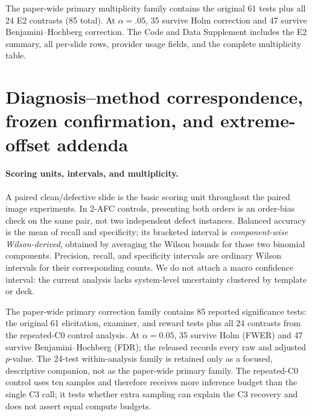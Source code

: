\documentclass[11pt]{article}
\begin{document}
The paper-wide primary multiplicity family contains the original 61 tests plus
all 24 E2 contrasts (85 total). At $\alpha=.05$, 35 survive Holm correction and
47 survive Benjamini--Hochberg correction. The Code and Data Supplement includes
the E2 summary, all per-slide rows, provider usage fields, and the complete
multiplicity table.

\section{Diagnosis--method correspondence, frozen confirmation, and extreme-offset addenda}
\label{app:w5-heldout}

\paragraph{Scoring units, intervals, and multiplicity.}
A paired clean/defective slide is the basic scoring unit throughout the paired
image experiments. In 2-AFC controls, presenting both orders is an order-bias
check on the same pair, not two independent defect instances. Balanced accuracy
is the mean of recall and specificity; its bracketed interval is
\emph{component-wise Wilson-derived}, obtained by averaging the Wilson bounds
for those two binomial components. Precision, recall, and specificity intervals
are ordinary Wilson intervals for their corresponding counts. We do not attach
a macro confidence interval: the current analysis lacks system-level uncertainty
clustered by template or deck.

The paper-wide primary correction family contains 85 reported significance
tests: the original 61 elicitation, examiner, and reward tests plus all 24
contrasts from the repeated-C0 control analysis. At $\alpha=0.05$, 35 survive
Holm (FWER) and 47 survive Benjamini--Hochberg (FDR); the released
 records every raw and adjusted
$p$-value. The 24-test within-analysis family is retained only as a focused,
descriptive companion, not as the paper-wide primary family. The repeated-C0
control uses ten samples and therefore receives more inference budget than the
single C3 call; it tests whether extra sampling can explain the C3 recovery and
does not assert equal compute budgets.
\end{document}
